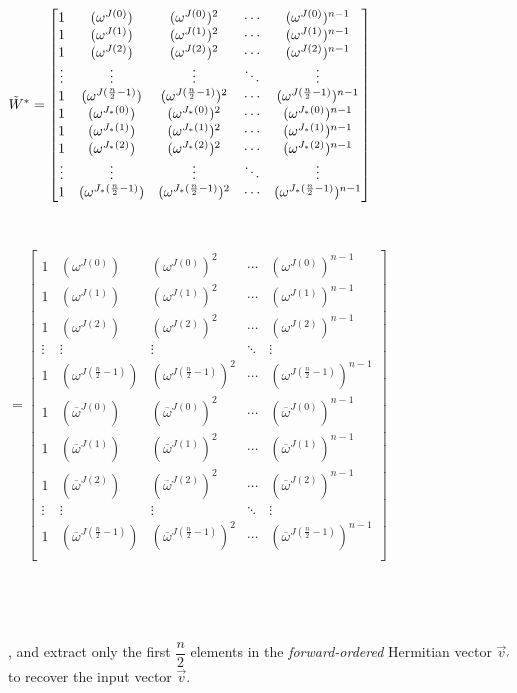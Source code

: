 \begin{tcolorbox}[title={\textbf{\tboxlabel{\ref*{subsec:ckks-encoding-decoding}} CKKS's Encoding and Decoding}}]
\noindent $\tilde{W}^* = \begin{bmatrix}
1 & (\omega^{J(0)}) & (\omega^{J(0)})^2 & \cdots & (\omega^{J(0)})^{n-1}\\
1 & (\omega^{J(1)}) & (\omega^{J(1)})^2 & \cdots & (\omega^{J(1)})^{n-1}\\
1 & (\omega^{J(2)}) & (\omega^{J(2)})^2 & \cdots & (\omega^{J(2)})^{n-1}\\
\vdots & \vdots & \vdots & \ddots & \vdots \\
1 & (\omega^{J(\frac{n}{2}-1)}) & (\omega^{J(\frac{n}{2}-1)})^2 & \cdots & (\omega^{J(\frac{n}{2}-1)})^{n-1}\\
1 & (\omega^{J_*(0)}) & (\omega^{J_*(0)})^2 & \cdots & (\omega^{J_*(0)})^{n-1}\\
1 & (\omega^{J_*(1)}) & (\omega^{J_*(1)})^2 & \cdots & (\omega^{J_*(1)})^{n-1}\\
1 & (\omega^{J_*(2)}) & (\omega^{J_*(2)})^2 & \cdots & (\omega^{J_*(2)})^{n-1}\\
\vdots & \vdots & \vdots & \ddots & \vdots \\
1 & (\omega^{J_*(\frac{n}{2}-1)}) & (\omega^{J_*(\frac{n}{2}-1)})^2 & \cdots & (\omega^{J_*(\frac{n}{2}-1)})^{n-1}\\
\end{bmatrix}$

$ $

\noindent $ = \begin{bmatrix}
1 & (\omega^{J(0)}) & (\omega^{J(0)})^2 & \cdots & (\omega^{J(0)})^{n-1}\\
1 & (\omega^{J(1)}) & (\omega^{J(1)})^2 & \cdots & (\omega^{J(1)})^{n-1}\\
1 & (\omega^{J(2)}) & (\omega^{J(2)})^2 & \cdots & (\omega^{J(2)})^{n-1}\\
\vdots & \vdots & \vdots & \ddots & \vdots \\
1 & (\omega^{J(\frac{n}{2}-1)}) & (\omega^{J(\frac{n}{2}-1)})^2 & \cdots & (\omega^{J(\frac{n}{2}-1)})^{n-1}\\
1 & (\overline\omega^{J(0)}) & (\overline\omega^{J(0)})^2 & \cdots & (\overline\omega^{J(0)})^{n-1}\\
1 & (\overline\omega^{J(1)}) & (\overline\omega^{J(1)})^2 & \cdots & (\overline\omega^{J(1)})^{n-1}\\
1 & (\overline\omega^{J(2)}) & (\overline\omega^{J(2)})^2 & \cdots & (\overline\omega^{J(2)})^{n-1}\\
\vdots & \vdots & \vdots & \ddots & \vdots \\
1 & (\overline\omega^{J(\frac{n}{2}-1)}) & (\overline\omega^{J(\frac{n}{2}-1)})^2 & \cdots & (\overline\omega^{J(\frac{n}{2}-1)})^{n-1}\\
\end{bmatrix}$

$ $

$ $

, and extract only the first $\dfrac{n}{2}$ elements in the \textit{forward-ordered} Hermitian vector $\vec{v}_{'}$ to recover the input vector $\vec{v}$.

\end{tcolorbox}

